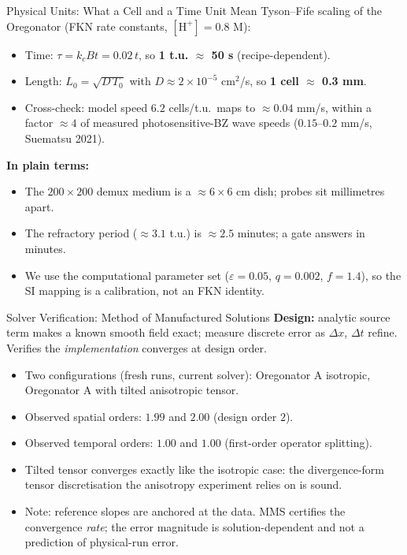 \documentclass[aspectratio=169,11pt]{beamer}
\begin{document}
\begin{frame}{Physical Units: What a Cell and a Time Unit Mean}
    Tyson--Fife scaling of the Oregonator (FKN rate constants, $[\mathrm{H}^+] = 0.8$ M):
    \begin{itemize}
        \item Time: $\tau = k_c B t = 0.02\,t$, so \textbf{1 t.u. $\approx$ 50 s} (recipe-dependent).
        \item Length: $L_0 = \sqrt{D\,T_0}$ with $D \approx 2\times10^{-5}$ cm$^2$/s, so \textbf{1 cell $\approx$ 0.3 mm}.
        \item Cross-check: model speed $6.2$ cells/t.u.\ maps to $\approx 0.04$ mm/s, within a factor $\approx 4$ of measured photosensitive-BZ wave speeds ($0.15$--$0.2$ mm/s, Suematsu 2021).
    \end{itemize}

    \vspace{0.3cm}
    \textbf{In plain terms:}
    \begin{itemize}
        \item The $200 \times 200$ demux medium is a $\approx 6 \times 6$ cm dish; probes sit millimetres apart.
        \item The refractory period ($\approx 3.1$ t.u.) is $\approx 2.5$ minutes; a gate answers in minutes.
        \item We use the computational parameter set ($\varepsilon = 0.05$, $q = 0.002$, $f = 1.4$), so the SI mapping is a calibration, not an FKN identity.
    \end{itemize}
\end{frame}

\begin{frame}{Solver Verification: Method of Manufactured Solutions}
    \textbf{Design:} analytic source term makes a known smooth field exact; measure discrete error as $\Delta x$, $\Delta t$ refine. Verifies the \emph{implementation} converges at design order.

    \vspace{0.2cm}
    \begin{itemize}
        \item Two configurations (fresh runs, current solver): Oregonator A isotropic, Oregonator A with tilted anisotropic tensor.
        \item Observed spatial orders: $1.99$ and $2.00$ (design order $2$).
        \item Observed temporal orders: $1.00$ and $1.00$ (first-order operator splitting).
        \item Tilted tensor converges exactly like the isotropic case: the divergence-form tensor discretisation the anisotropy experiment relies on is sound.
        \item Note: reference slopes are anchored at the data. MMS certifies the convergence \emph{rate}; the error magnitude is solution-dependent and not a prediction of physical-run error.
    \end{itemize}
\end{frame}
\end{document}
